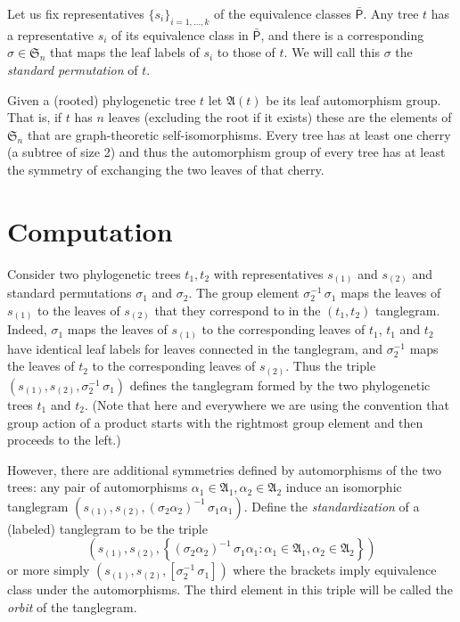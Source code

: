 \documentclass{amsart}
\newcommand{\fS}{\mathfrak S}
\newcommand{\fA}{\mathfrak A}
\newcommand{\ptree}{\mathsf{P}}
\newcommand{\ptequiv}{\bar{\ptree}}  %
\begin{document}
Let us fix representatives $\{s_i\}_{i=1,\ldots,k}$ of the equivalence classes $\ptequiv$.
Any tree $t$ has a representative $s_i$ of its equivalence class in $\ptequiv$, and there is a corresponding $\sigma \in \fS_n$ that maps the leaf labels of $s_i$ to those of $t$.
We will call this $\sigma$ the \emph{standard permutation} of $t$.

Given a (rooted) phylogenetic tree $t$ let $\fA(t)$ be its leaf automorphism group.
That is, if $t$ has $n$ leaves (excluding the root if it exists) these are the elements of $\fS_n$ that are graph-theoretic self-isomorphisms.
Every tree has at least one cherry (a subtree of size 2) and thus the automorphism group of every tree has at least the symmetry of exchanging the two leaves of that cherry.


\section{Computation}
Consider two phylogenetic trees $t_1, t_2$ with representatives $s_{(1)}$ and $s_{(2)}$ and standard permutations $\sigma_1$ and $\sigma_2$.
The group element $\sigma_2^{-1} \, \sigma_1$ maps the leaves of $s_{(1)}$ to the leaves of $s_{(2)}$ that they correspond to in the $(t_1, t_2)$ tanglegram.
Indeed, $\sigma_1$ maps the leaves of $s_{(1)}$ to the corresponding leaves of $t_1$, $t_1$ and $t_2$ have identical leaf labels for leaves connected in the tanglegram, and $\sigma_2^{-1}$ maps the leaves of $t_2$ to the corresponding leaves of $s_{(2)}$.
Thus the triple $(s_{(1)}, s_{(2)}, \sigma_2^{-1} \, \sigma_1)$ defines the tanglegram formed by the two phylogenetic trees $t_1$ and $t_2$.
(Note that here and everywhere we are using the convention that group action of a product starts with the rightmost group element and then proceeds to the left.)

However, there are additional symmetries defined by automorphisms of the two trees: any pair of automorphisms $\alpha_1 \in \fA_1, \alpha_2 \in \fA_2$ induce an isomorphic tanglegram $(s_{(1)}, s_{(2)}, \left(\sigma_2 \alpha_2 \right)^{-1} \, \sigma_1 \alpha_1)$.
Define the \emph{standardization} of a (labeled) tanglegram to be the triple
\begin{equation}
\label{eq:orbit}
\left(s_{(1)}, s_{(2)}, \left\{(\sigma_2 \alpha_2)^{-1} \, \sigma_1 \alpha_1 : \alpha_1 \in \fA_1, \alpha_2 \in \fA_2  \right\}\right)
\end{equation}
or more simply $(s_{(1)}, s_{(2)}, [\sigma_2^{-1} \, \sigma_1])$ where the brackets imply equivalence class under the automorphisms.
The third element in this triple will be called the \emph{orbit} of the tanglegram.
\end{document}
